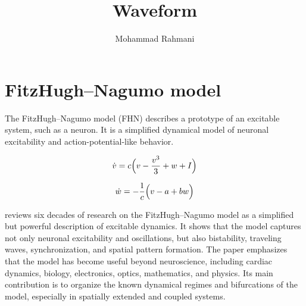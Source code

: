 \documentclass[a4paper]{article}
\title{Waveform}
\author{Mohammad Rahmani}
\date{}
\begin{document}
    \maketitle
    
    
    \section{FitzHugh--Nagumo model}
        
        The FitzHugh--Nagumo model (FHN)\cite{cebrian-lacasa-2025-six-decades-of-the-fitzhugh-nagumo-model-a-guide-through-its-spatio-temporal-dynamics-and-influence-across-disciplines} describes a prototype of an excitable system, such as a neuron.
        It is a simplified dynamical model of neuronal excitability and action-potential-like behavior.
        
        \begin{equation}
            \dot{v}
            =
            c
            \Bigl(
            v
            -
            \frac{v^{3}}{3}
            +
            w
            +
            I
            \Bigr)
        \end{equation}
        
        \begin{equation}
            \dot{w}
            =
            -
            \frac{1}{c}
            \Bigl(
            v
            -
            a
            +
            bw
            \Bigr)
        \end{equation}
        
        \cite{cebrian-lacasa-2025-six-decades-of-the-fitzhugh-nagumo-model-a-guide-through-its-spatio-temporal-dynamics-and-influence-across-disciplines}
        reviews six decades of research on the FitzHugh--Nagumo model as a simplified but powerful description of excitable dynamics.
        It shows that the model captures not only neuronal excitability and oscillations, but also bistability, traveling waves, synchronization, and spatial pattern formation.
        The paper emphasizes that the model has become useful beyond neuroscience, including cardiac dynamics, biology, electronics, optics, mathematics, and physics.
        Its main contribution is to organize the known dynamical regimes and bifurcations of the model, especially in spatially extended and coupled systems.
    
    
    
            
            
            
\end{document}
